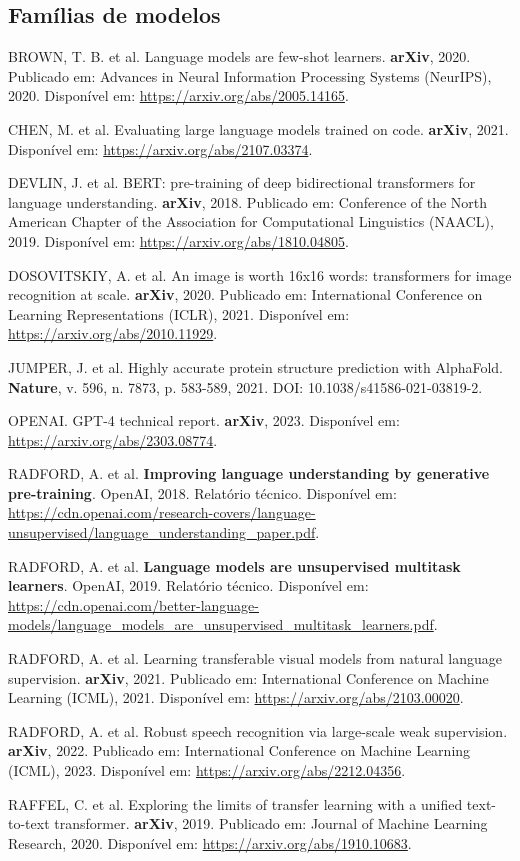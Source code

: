 \documentclass[11pt,a4paper]{article}
\begin{document}
\subsection{Famílias de modelos}
BROWN, T. B. et al. Language models are few-shot learners. \textbf{arXiv}, 2020. Publicado em: Advances in Neural Information Processing Systems (NeurIPS), 2020. Disponível em: \url{https://arxiv.org/abs/2005.14165}.\par
CHEN, M. et al. Evaluating large language models trained on code. \textbf{arXiv}, 2021. Disponível em: \url{https://arxiv.org/abs/2107.03374}.\par
DEVLIN, J. et al. BERT: pre-training of deep bidirectional transformers for language understanding. \textbf{arXiv}, 2018. Publicado em: Conference of the North American Chapter of the Association for Computational Linguistics (NAACL), 2019. Disponível em: \url{https://arxiv.org/abs/1810.04805}.\par
DOSOVITSKIY, A. et al. An image is worth 16x16 words: transformers for image recognition at scale. \textbf{arXiv}, 2020. Publicado em: International Conference on Learning Representations (ICLR), 2021. Disponível em: \url{https://arxiv.org/abs/2010.11929}.\par
JUMPER, J. et al. Highly accurate protein structure prediction with AlphaFold. \textbf{Nature}, v. 596, n. 7873, p. 583-589, 2021. DOI: 10.1038/s41586-021-03819-2.\par
OPENAI. GPT-4 technical report. \textbf{arXiv}, 2023. Disponível em: \url{https://arxiv.org/abs/2303.08774}.\par
RADFORD, A. et al. \textbf{Improving language understanding by generative pre-training}. OpenAI, 2018. Relatório técnico. Disponível em: \url{https://cdn.openai.com/research-covers/language-unsupervised/language_understanding_paper.pdf}.\par
RADFORD, A. et al. \textbf{Language models are unsupervised multitask learners}. OpenAI, 2019. Relatório técnico. Disponível em: \url{https://cdn.openai.com/better-language-models/language_models_are_unsupervised_multitask_learners.pdf}.\par
RADFORD, A. et al. Learning transferable visual models from natural language supervision. \textbf{arXiv}, 2021. Publicado em: International Conference on Machine Learning (ICML), 2021. Disponível em: \url{https://arxiv.org/abs/2103.00020}.\par
RADFORD, A. et al. Robust speech recognition via large-scale weak supervision. \textbf{arXiv}, 2022. Publicado em: International Conference on Machine Learning (ICML), 2023. Disponível em: \url{https://arxiv.org/abs/2212.04356}.\par
RAFFEL, C. et al. Exploring the limits of transfer learning with a unified text-to-text transformer. \textbf{arXiv}, 2019. Publicado em: Journal of Machine Learning Research, 2020. Disponível em: \url{https://arxiv.org/abs/1910.10683}.\par
\end{document}
